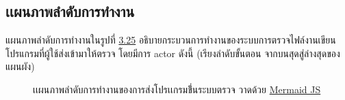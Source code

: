 \documentclass[12pt,one side,openright,a4paper]{cpe-thesis-th}
\newcommand{\thaijustify}[1]{%
  \par\hspace{30pt}\justifying
  #1
}
\begin{document}
\subsection{เเผนภาพลำดับการทำงาน}
\thaijustify{
  แผนภาพลำดับการทำงานในรูปที่ \hyperlink{comp-diagram}{3.25} อธิบายกระบวนการทำงานของระบบการตรวจไฟล์งานเขียนโปรแกรมที่ผู้ใช้ส่งเข้ามาให้ตรวจ โดยมีการ actor ดังนี้ (เรียงลำดับขั้นตอน จากบนสุดสู่ล่างสุดของแผนผัง)
}
\hypertarget{seq-diagram1}{
  \begin{figure}[!h]
    \centering
    \caption[ภาพเเผนภาพลำดับการทำงาน]{เเผนภาพลำดับการทำงานของการส่งโปรเเกรมขึ่้นระบบตรวจ วาดด้วย \href{https://mermaid.js.org/}{Mermaid JS}}
    \label{fig:seq-diagram1}
  \end{figure}
}
\end{document}
